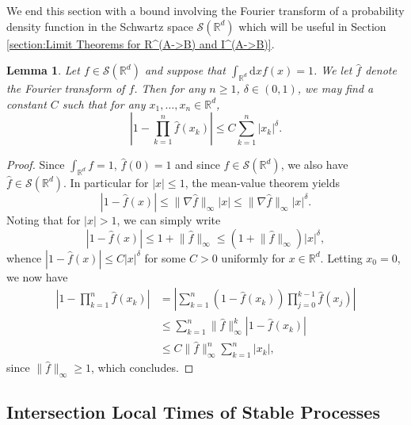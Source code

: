 \documentclass[10pt,a4paper]{amsart}
\newcommand{\RR}{\mathbb R}
\newcommand{\1}{\mathds{1}}
\renewcommand{\d}{\mathrm d}
\newtheorem{lemma}{Lemma}
\numberwithin{equation}{section}
\begin{document}
We end this section with a bound involving the Fourier transform of a probability density function in the Schwartz space $\mathcal S(\RR^d)$ which will be useful in Section \ref{section:Limit Theorems for R^(A->B) and I^(A->B)}.

\begin{lemma}
    \label{ineq:bound for products of Fourier transform}
    Let $f\in\mathcal S(\RR^d)$ and suppose that $\int_{\RR^d}\d x f(x)=1$. We let $\hat f$ denote the Fourier transform of $f$. Then for any $n\ge1$, $\delta\in(0,1)$, we may find a constant $C$ such that for any $x_1,\dots,x_n\in\RR^d$,
    \begin{equation*}
        \left|1-\prod_{k=1}^n\hat f(x_k)\right|\le C\sum_{k=1}^n|x_k|^\delta.
    \end{equation*}
\end{lemma}

\begin{proof}
    Since $\int_{\RR^d}f=1$, $\hat f(0)=1$ and since $f\in\mathcal S(\RR^d)$, we also have $\hat f\in\mathcal S(\RR^d)$. In particular for $|x|\le 1$, the mean-value theorem yields
    \begin{equation*}
        \left|1-\hat f(x)\right|\le\lVert\nabla \hat f\rVert_\infty|x|\le \lVert\nabla \hat f\rVert_\infty|x|^\delta.
    \end{equation*}
    Noting that for $|x|>1$, we can simply write
    \begin{equation*}
        \left|1-\hat f(x)\right|\le 1+\lVert \hat f\rVert_\infty\le (1+\lVert \hat f\rVert_\infty)|x|^\delta,
    \end{equation*}
    whence $|1-\hat f(x)|\le C|x|^\delta$  for some $C>0$ uniformly for $x\in\RR^d$. Letting $x_0=0$, we now have 
    \begin{align*}
        \left|1-\prod_{k=1}^n\hat f(x_k)\right|&=\left|\sum_{k=1}^n \left(1-\hat f(x_k)\right)\prod_{j=0}^{k-1}\hat f(x_j)\right|\\
        &\le \sum_{k=1}^n\lVert \hat f\rVert_\infty^k\left|1-\hat f(x_k)\right|\\
        &\le C\lVert\hat f\rVert_\infty^n\sum_{k=1}^n|x_k|,
    \end{align*}
    since $\lVert\hat f\rVert_\infty\ge1$, which concludes.
\end{proof}

\subsection{Intersection Local Times of Stable Processes}
\end{document}
